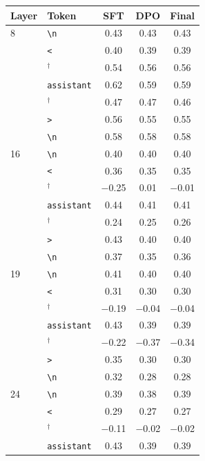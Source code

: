 \begin{table}[!htbp]
\centering
\small
\begin{tabular}{llccc}
\toprule
Layer & Token & SFT & DPO & Final \\
\midrule
8 & \texttt{\textbackslash n} & 0.43 & 0.43 & 0.43 \\
 & \texttt{\textless{}} & 0.40 & 0.39 & 0.39 \\
 & \texttt{\textbar{}}$^{\dagger}$ & 0.54 & 0.56 & 0.56 \\
 & \texttt{assistant} & 0.62 & 0.59 & 0.59 \\
 & \texttt{\textbar{}}$^{\dagger}$ & 0.47 & 0.47 & 0.46 \\
 & \texttt{\textgreater{}} & 0.56 & 0.55 & 0.55 \\
 & \texttt{\textbackslash n} & 0.58 & 0.58 & 0.58 \\
\midrule
16 & \texttt{\textbackslash n} & 0.40 & 0.40 & 0.40 \\
 & \texttt{\textless{}} & 0.36 & 0.35 & 0.35 \\
 & \texttt{\textbar{}}$^{\dagger}$ & $-$0.25 & 0.01 & $-$0.01 \\
 & \texttt{assistant} & 0.44 & 0.41 & 0.41 \\
 & \texttt{\textbar{}}$^{\dagger}$ & 0.24 & 0.25 & 0.26 \\
 & \texttt{\textgreater{}} & 0.43 & 0.40 & 0.40 \\
 & \texttt{\textbackslash n} & 0.37 & 0.35 & 0.36 \\
\midrule
19 & \texttt{\textbackslash n} & 0.41 & 0.40 & 0.40 \\
 & \texttt{\textless{}} & 0.31 & 0.30 & 0.30 \\
 & \texttt{\textbar{}}$^{\dagger}$ & $-$0.19 & $-$0.04 & $-$0.04 \\
 & \texttt{assistant} & 0.43 & 0.39 & 0.39 \\
 & \texttt{\textbar{}}$^{\dagger}$ & $-$0.22 & $-$0.37 & $-$0.34 \\
 & \texttt{\textgreater{}} & 0.35 & 0.30 & 0.30 \\
 & \texttt{\textbackslash n} & 0.32 & 0.28 & 0.28 \\
\midrule
24 & \texttt{\textbackslash n} & 0.39 & 0.38 & 0.39 \\
 & \texttt{\textless{}} & 0.29 & 0.27 & 0.27 \\
 & \texttt{\textbar{}}$^{\dagger}$ & $-$0.11 & $-$0.02 & $-$0.02 \\
 & \texttt{assistant} & 0.43 & 0.39 & 0.39 \\

\end{tabular}
\end{table}
